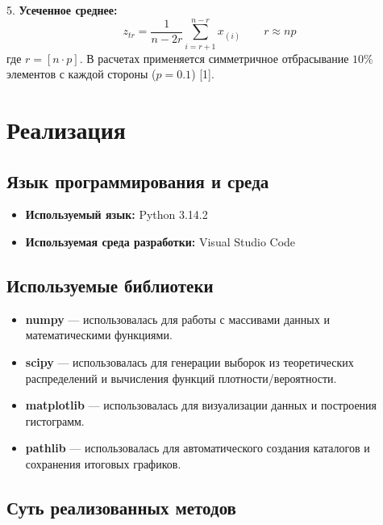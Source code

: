 \documentclass[a4paper, 14pt]{extarticle}
\begin{document}
5. \textbf{Усеченное среднее:}
\begin{equation}
    z_{tr} = \frac{1}{n-2r} \sum_{i=r+1}^{n-r} x_{(i)} \qquad r\approx np
\end{equation}
где $r = [n \cdot p]$. В расчетах применяется симметричное отбрасывание $10\%$ элементов с каждой стороны ($p=0.1$) [1].

\section{Реализация}

\subsection{Язык программирования и среда}
    \begin{itemize}
        \item \textbf{Используемый язык:} Python 3.14.2
        \item \textbf{Используемая среда разработки:} Visual Studio Code
    \end{itemize}

\subsection{Используемые библиотеки}
    \begin{itemize}
        \item \textbf{numpy} --- использовалась для работы с массивами данных и математическими функциями.
        \item \textbf{scipy} --- использовалась для генерации выборок из теоретических распределений и вычисления функций плотности/вероятности.
        \item \textbf{matplotlib} --- использовалась для визуализации данных и построения гистограмм.
        \item \textbf{pathlib} --- использовалась для автоматического создания каталогов и сохранения итоговых графиков.
    \end{itemize}

\subsection{Суть реализованных методов}
\end{document}
